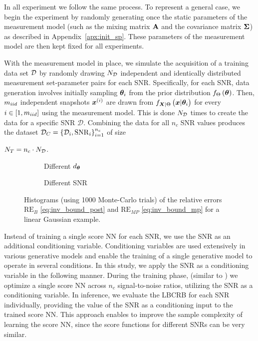 {In all experiment we follow the same process. {To represent a general case,} we  begin the experiment by randomly generating once the static parameters of the measurement model (such as the mixing matrix $\mathbf{A}$ and the covariance matrix $\mathbf{\Sigma}$) as described in Appendix~\ref{apx:init_sp}. {These parameters of the measurement model are then kept fixed for all experiments.} 

With the measurement model in place, {we simulate the acquisition of a training data set $\mathcal{D}$ by} randomly drawing $N_{\mathcal{D}}$ 
independent and identically distributed measurement set-parameter pairs for each SNR. Specifically, 
%
for each SNR, data generation involves initially sampling $\bm{\theta}_i$ from the prior distribution $f_{\Theta}\left(\bm{\theta}\right)$. Then, $m_{iid}$ independent snapshots ${\bm{x}}^{(i)}$ are drawn from 
$\probt{\x|\p_i}{\X{|}\pr}$ for every $i \in [1,m_{iid}]$ using the measurement model. This is done $N_{\mathcal{D}}$ times to create the data for a specific SNR $\mathcal{D}$. Combining the data for all {$n_c$} SNR values %
produces the dataset $\mathcal{D}_C=\set{\mathcal{D}_i,\mathrm{SNR}_i}_{i=1}^{n_c}$
of size %
{$N_T=n_c \cdot N_{\mathcal{D}}$. 

}
\begin{figure*}[t]
    \centering
    \begin{subfigure}[b]{0.45\textwidth}
        \centering
        
        \caption{Different ${d_{\bm{\theta}}}$}\label{fig:m_re_hist}
    \end{subfigure}%
    \begin{subfigure}[b]{0.45\textwidth}
        \centering
        
        \caption{Different SNR}\label{fig:snr_re_hist}
    \end{subfigure}
    \caption{Histograms %
    {(using 1000 Monte-Carlo trials)} %
    of the \name{} relative errors %
    $\mathrm{RE}_{B}$ 
    \eqref{eq:inv_bound_post} and $\mathrm{RE}_{MP}$ \eqref{eq:inv_bound_mp} for a linear Gaussian example. }
    \label{fig:hist_sample}
\end{figure*}
{Instead of training a single score NN for each SNR, we use {the SNR as an additional conditioning variable.} Conditioning variables are used extensively  in various generative models \cite{mirza2014conditional,abdelhamed2019noise,liu2019conditional,ho2021classifier} and enable the training of a single generative model to operate in several conditions. In this study, we apply the SNR as a conditioning variable in the following manner.  }
During the training phase, %
{(similar to \cite{habi2024learning})} we optimize a single score
NN across $n_c$ signal-to-noise ratios, utilizing the SNR as a conditioning variable. 
%
{In inference, we evaluate the LBCRB for each SNR individually, {providing the value of the SNR as a conditioning input to the trained score NN.} This approach enables to improve the sample complexity {of learning the score NN}, since {the score functions for} different SNRs can be very similar.  } 


}
